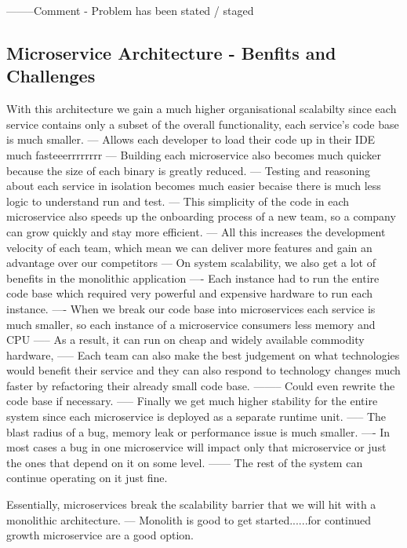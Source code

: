 \documentclass[a4paper, 11pt]{book}
\begin{document}
{    --------Comment - Problem has been stated / staged

    \subsection{Microservice Architecture - Benfits and Challenges}
    With this architecture we gain a much higher organisational scalabilty since each service contains only a subset of the overall functionality, each service's code base is much smaller.
    --- Allows each developer to load their code up in their IDE much fasteeerrrrrrrr
    --- Building each microservice also becomes much quicker because the size of each binary is greatly reduced.
    --- Testing and reasoning about each service in isolation becomes much easier becaise there is much less logic to understand run and test.
    --- This simplicity of the code in each microservice also speeds up the onboarding process of a new team, so a company can grow quickly and stay more efficient.
    --- All this increases the development velocity of each team, which mean we can deliver more features and gain an advantage over our competitors
    --- On system scalability, we also get a lot of benefits in the monolithic application
    ---- Each instance had to run the entire code base which required very powerful and expensive hardware to run each instance.
    ---- When we break our code base into microservices each service is much smaller, so each instance of a microservice consumers less memory and CPU
    ----- As a result, it can run on cheap and widely available commodity hardware,
    ----- Each team can also make the best judgement on what technologies would benefit their service and they can also respond to technology changes much faster by refactoring their already small code base.
    -------- Could even rewrite the code base if necessary.
    ----- Finally we get much higher stability for the entire system since each microservice is deployed as a separate runtime unit.
    ----- The blast radius of a bug, memory leak or performance issue is much smaller.
    ---- In most cases a bug in one microservice will impact only that microservice or just the ones that depend on it on some level.
    ------ The rest of the system can continue operating on it just fine.

    Essentially, microservices break the scalability barrier that we will hit with a monolithic architecture.
    --- Monolith is good to get started......for continued growth microservice are a good option.

}
\end{document}
